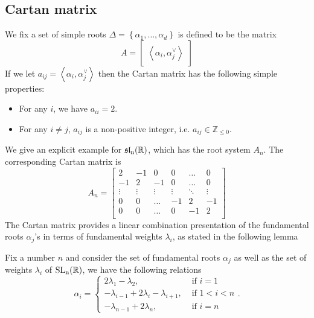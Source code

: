 \subsection{Cartan matrix}
We fix a set of simple roots $\Delta = \left\lbrace \alpha_1,\ldots,\alpha_d \right\rbrace$ is defined to be the matrix
\[A = \begin{bmatrix} \left\langle \alpha_i,\alpha_j^\vee  \right\rangle
    \end{bmatrix}\]
If we let $a_{ij}=  \left\langle \alpha_i,\alpha_j^\vee\right\rangle$ then the Cartan matrix has the following simple properties:
\begin{lemma}
    \hfill
    \begin{itemize}
        \item For any $i$, we have $a_{ii}=2$.
        \item For any $i \ne j$, $a_{ij}$ is a non-positive integer, i.e. $a_{ij} \in \mathbb{Z}_{\le 0}$.
    \end{itemize}
\end{lemma}
We give an explicit example for $\operatorname{\mathfrak{sl}_n(\mathbb{R})}$, which has the root system $A_n$. The corresponding Cartan matrix is
\[A_n = \begin{bmatrix}
        2      & -1     & 0      & 0      & \ldots & 0      \\
        -1     & 2      & -1     & 0      & \ldots & 0      \\
        \vdots & \vdots & \vdots & \vdots & \ddots & \vdots \\
        0      & 0      & \ldots & -1     & 2      & -1     \\
        0      & 0      & \ldots & 0      & -1     & 2      \\
    \end{bmatrix}\]
The Cartan matrix provides a linear combination presentation of the fundamental roots $\alpha_j$'s in terms of fundamental weights $\lambda_i$,
as stated in the following lemma
\begin{lemma}\label{weight-root-comb}
    Fix a number $n$ and consider the set of fundamental roots $\alpha_j$ as well as the set of weights $\lambda_i$ of $\operatorname{\text{SL}_n(\mathbb{R})}$, we have the following relations
    \[\alpha_i = \begin{cases}
            2\lambda_1-\lambda_2,                    & \mbox{ if } i = 1 \\
            -\lambda_{i-1}+2\lambda_i-\lambda_{i+1}, & \mbox{ if } 1<i<n \\
            -\lambda_{n-1}+2\lambda_n,               & \mbox{ if } i =n
        \end{cases}.\]
\end{lemma}
